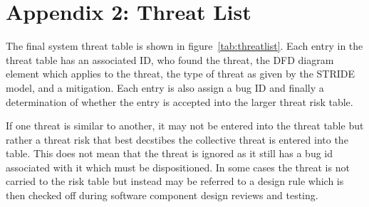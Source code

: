 \cleardoublepage
\chapter{Appendix 2: Threat List}
\label{ch:threatlist}

The final system threat table is shown in figure~\ref{tab:threatlist}.  Each
entry in the threat table has an associated ID, who found the threat, the DFD
diagram element which applies to the threat, the type of threat as given by the
STRIDE model, and a mitigation.  Each entry is also assign a bug ID and finally
a determination of whether the entry is accepted into the larger threat risk
table.  
\par If one threat is similar to another, it may not be entered into the threat
table but rather a threat risk that best decstibes the collective threat is
entered into the table.  This does not mean that the threat is ignored as it
still has a bug id associated with it which must be dispositioned.  In some
cases the threat is not carried to the risk table but instead may be referred to
a design rule which is then checked off during software component design reviews
and testing.


